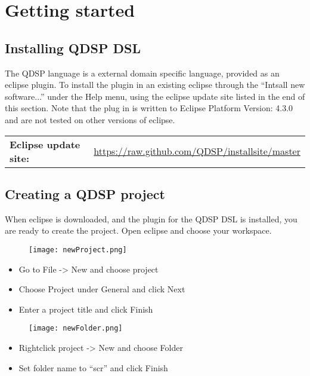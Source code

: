 \chapter{Getting started}
\section{Installing QDSP DSL}
The QDSP language is a external domain specific language, provided as an eclipse plugin. To install the plugin in an existing eclipse through the ``Intsall new software...'' under the Help menu, using the eclipse update site listed in the end of this section. Note that the plug in is written to Eclipse Platform Version: 4.3.0 and are not tested on other versions of eclipse.

\begin{table}[H]
	\centering
		\begin{tabular}{ll}
			\textbf{Eclipse update site:} & \url{https://raw.github.com/QDSP/installsite/master}
		\end{tabular}
\end{table}

\section{Creating a QDSP project}
When eclipse is downloaded, and the plugin for the QDSP DSL is installed, you are ready to create the project. Open eclipse and choose your workspace.

\begin{figure}[H]
	\centering
		\texttt{[image: newProject.png]}
		\label{fig:newProject}
\end{figure}

\begin{itemize}[leftmargin=3cm]
	\item Go to File -> New and choose project
	\item Choose Project under General and click Next
	\item Enter a project title and click Finish
\end{itemize}

\begin{figure}[H]
	\centering
		\texttt{[image: newFolder.png]}
		\label{fig:newFolder}
\end{figure}

\begin{itemize}[leftmargin=3cm]
	\item Rightclick project -> New and choose Folder
	\item Set folder name to ``scr'' and click Finish
\end{itemize}

